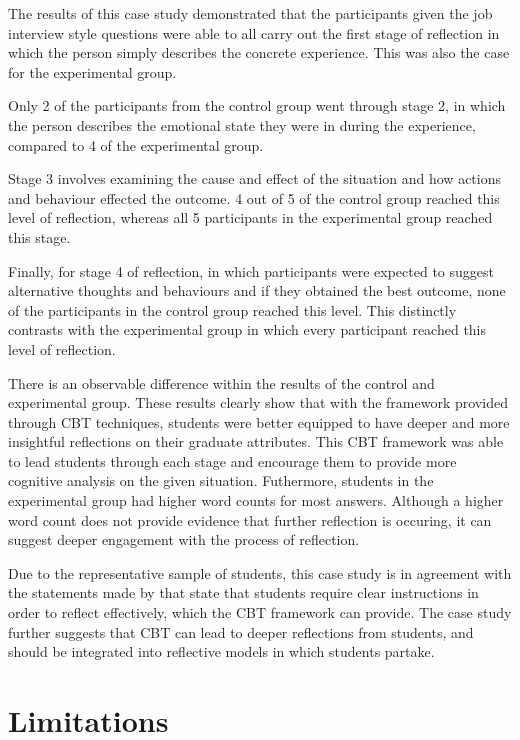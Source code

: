 \documentclass{l4proj}
\begin{document}
The results of this case study demonstrated that the participants given the job interview style questions were able to all carry out the first stage of reflection in which the person simply describes the concrete experience. This was also the case for the experimental group. 

Only 2 of the participants from the control group went through stage 2, in which the person describes the emotional state they were in during the experience, compared to 4 of the experimental group.

Stage 3 involves examining the cause and effect of the situation and how actions and behaviour effected the outcome. 4 out of 5 of the control group reached this level of reflection, whereas all 5 participants in the experimental group reached this stage.

Finally, for stage 4 of reflection, in which participants were expected to suggest alternative thoughts and behaviours and if they obtained the best outcome, none of the participants in the control group reached this level. This distinctly contrasts with the experimental group in which every participant reached this level of reflection.

There is an observable difference within the results of the control and experimental group. These results clearly show that with the framework provided through CBT techniques, students were better equipped to have deeper and more insightful reflections on their graduate attributes. This CBT framework was able to lead students through each stage and encourage them to provide more cognitive analysis on the given situation. Futhermore, students in the experimental group had higher word counts for most answers. Although a higher word count does not provide evidence that further reflection is occuring, it can suggest deeper engagement with the process of reflection. 

Due to the representative sample of students, this case study is in agreement with the statements made by \citet{bruno_reflective_2018} that state that students require clear instructions in order to reflect effectively, which the CBT framework can provide. The case study further suggests that CBT can lead to deeper reflections from students, and should be integrated into reflective models in which students partake.

\section{Limitations}
\end{document}
